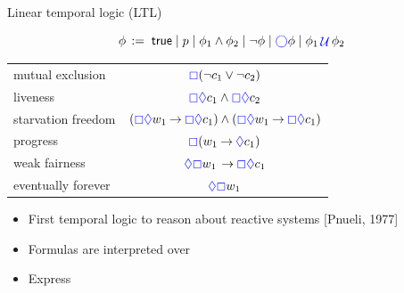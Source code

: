 \documentclass[aspectratio=169]{beamer}
\begin{document}
%


\begin{slide}{Linear temporal logic (LTL)}\label{s:44}
\small

\[
\phi\, := \; \true \mid p \mid  \phi_1 \wedge \phi_2 \mid \neg \phi \mid \blue\nexts \phi \mid  \phi_1 \,\blue\Until\, \phi_2 %
\]
\vspace{0.5cm}
\begin{center}
\begin{tabular}{|l|c|}
\hline
mutual exclusion  & $\textcolor{blue}{\boxempty} (\neg c_1 \vee \neg c_2)$ \\
 liveness & $\textcolor{blue}{\boxempty} \textcolor{blue}{\Diamond} c_1 \wedge \textcolor{blue}{\boxempty} \textcolor{blue}{\Diamond} c_2$\\
starvation freedom  & $(\textcolor{blue}{\boxempty} \textcolor{blue}{\Diamond} w_1 \mathbin{\rightarrow} \textcolor{blue}{\boxempty} \textcolor{blue}{\Diamond} c_1) \wedge
(\textcolor{blue}{\boxempty} \textcolor{blue}{\Diamond} w_1 \mathbin{\rightarrow} \textcolor{blue}{\boxempty} \textcolor{blue}{\Diamond} c_1)$ \\
progress & $\textcolor{blue}{\boxempty} (w_1 \mathbin{\rightarrow} \textcolor{blue}{\Diamond} c_1)$\\
weak fairness & $\textcolor{blue}{\Diamond} \textcolor{blue}{\boxempty} w_1 \, \mathbin{\rightarrow} \textcolor{blue}{\boxempty} \textcolor{blue}{\Diamond} c_1$\\
eventually forever & $\textcolor{blue}{\Diamond} \textcolor{blue}{\boxempty} w_1$\\
\hline
\end{tabular}  
\end{center}

\begin{itemize}
\item First temporal logic to reason about reactive systems [Pnueli, 1977]
\item Formulas are interpreted over 
\item Express 
\end{itemize}
\end{slide}
\end{document}
